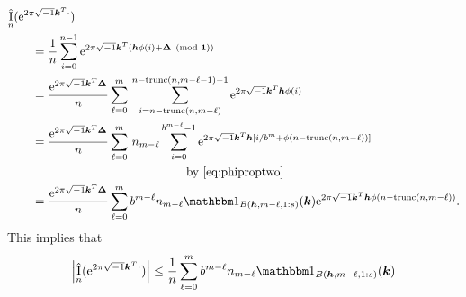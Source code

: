 \documentclass[authoryear]{elsarticle}
\DeclareMathOperator{\appxint}{\hat{I}}
\DeclareMathOperator{\trun}{trunc}
\begin{document}
\begin{align*}
    \MoveEqLeft{\appxint_{n}(\me^{2 \pi \sqrt{-1} \vk^T \cdot}) } \\
    &= \frac 1{n} \sum_{i=0}^{n-1} \me^{2 \pi \sqrt{-1} \vk^T (\vh\phi(i) + \vDelta \pmod{\vone})} \\
    \nonumber
    &= \frac {\me^{2 \pi \sqrt{-1} \vk^T \vDelta}}{n} \sum_{\ell = 0}^{m} \,
    \sum_{i=n - \trun(n,m-\ell) }^{n - \trun(n,m-\ell-1)  -1} \me^{2 \pi \sqrt{-1} \vk^T \vh\phi(i)} \\
    &= \frac {\me^{2 \pi \sqrt{-1} \vk^T \vDelta}}{n} \sum_{\ell = 0}^{m} \, n_{m-\ell}
    \sum_{i=0 }^{b^{m-\ell}  -1} \me^{2 \pi \sqrt{-1} \vk^T \vh[i/b^m + \phi(n - \trun(n,m-\ell))]} \\
    & \hspace{30ex} \text{by \eqref{eq:phiproptwo}} \\
    & = \frac {\me^{2 \pi \sqrt{-1} \vk^T \vDelta}}{n} \sum_{\ell = 0}^{m} b^{m-\ell} n_{m - \ell} \bbone_{B(\vh,m-\ell,1:s)}(\vk) \me^{2 \pi \sqrt{-1} \vk^T \vh\phi(n - \trun(n,m-\ell))}.
\end{align*}
This implies that
\begin{equation} \label{eq:ihatarbn}
    \abs{\appxint_{n}(\me^{2 \pi \sqrt{-1} \vk^T \cdot})} \le \frac {1}{n} \sum_{\ell = 0}^{m} b^{m-\ell} n_{m - \ell} \bbone_{B(\vh,m-\ell, 1:s)}(\vk)
\end{equation}
\end{document}
